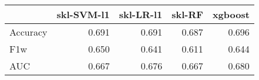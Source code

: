 \begin{tabular}{lrrrr}
\toprule
{} &  skl-SVM-l1 &  skl-LR-l1 &  skl-RF &  xgboost \\
\midrule
Accuracy &       0.691 &      0.691 &   0.687 &    0.696 \\
F1w      &       0.650 &      0.641 &   0.611 &    0.644 \\
AUC      &       0.667 &      0.676 &   0.667 &    0.680 \\
\bottomrule
\end{tabular}
